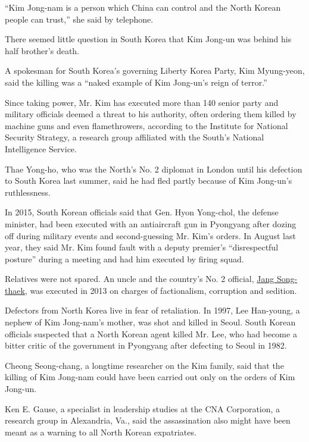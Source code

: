 ``Kim Jong-nam is a person which China can control and the North Korean
people can trust,'' she said by telephone.

There seemed little question in South Korea that Kim Jong-un was behind
his half brother's death.

A spokesman for South Korea's governing Liberty Korea Party, Kim
Myung-yeon, said the killing was a ``naked example of Kim Jong-un's
reign of terror.''

Since taking power, Mr. Kim has executed more than 140 senior party and
military officials deemed a threat to his authority, often ordering them
killed by machine guns and even flamethrowers, according to the
Institute for National Security Strategy, a research group affiliated
with the South's National Intelligence Service.

Thae Yong-ho, who was the North's No. 2 diplomat in London until his
defection to South Korea last summer, said he had fled partly because of
Kim Jong-un's ruthlessness.

In 2015, South Korean officials said that Gen. Hyon Yong-chol, the
defense minister, had been executed with an antiaircraft gun in
Pyongyang after dozing off during military events and second-guessing
Mr. Kim's orders. In August last year, they said Mr. Kim found fault
with a deputy premier's ``disrespectful posture'' during a meeting and
had him executed by firing squad.

Relatives were not spared. An uncle and the country's No. 2 official,
\href{https://www.nytimes3xbfgragh.onion/2016/03/13/world/asia/north-korea-executions-jang-song-thaek.html}{Jang
Song-thaek}, was executed in 2013 on charges of factionalism, corruption
and sedition.

Defectors from North Korea live in fear of retaliation. In 1997, Lee
Han-young, a nephew of Kim Jong-nam's mother, was shot and killed in
Seoul. South Korean officials suspected that a North Korean agent killed
Mr. Lee, who had become a bitter critic of the government in Pyongyang
after defecting to Seoul in 1982.

Cheong Seong-chang, a longtime researcher on the Kim family, said that
the killing of Kim Jong-nam could have been carried out only on the
orders of Kim Jong-un.

Ken E. Gause, a specialist in leadership studies at the CNA Corporation,
a research group in Alexandria, Va., said the assassination also might
have been meant as a warning to all North Korean expatriates.

